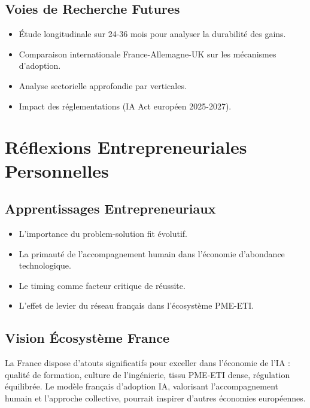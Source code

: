 \subsection{Voies de Recherche Futures}
\begin{itemize}
    \item Étude longitudinale sur 24-36 mois pour analyser la durabilité des gains.
    \item Comparaison internationale France-Allemagne-UK sur les mécanismes d'adoption.
    \item Analyse sectorielle approfondie par verticales.
    \item Impact des réglementations (IA Act européen 2025-2027).
\end{itemize}

\section{Réflexions Entrepreneuriales Personnelles}

\subsection{Apprentissages Entrepreneuriaux}
\begin{itemize}
    \item L'importance du problem-solution fit évolutif.
    \item La primauté de l'accompagnement humain dans l'économie d'abondance technologique.
    \item Le timing comme facteur critique de réussite.
    \item L'effet de levier du réseau français dans l'écosystème PME-ETI.
\end{itemize}

\subsection{Vision Écosystème France}
La France dispose d'atouts significatifs pour exceller dans l'économie de l'IA : qualité de formation, culture de l'ingénierie, tissu PME-ETI dense, régulation équilibrée. Le modèle français d'adoption IA, valorisant l'accompagnement humain et l'approche collective, pourrait inspirer d'autres économies européennes.


